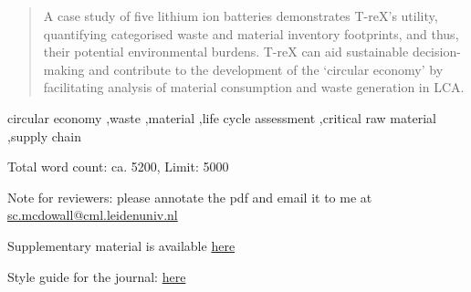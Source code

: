 \documentclass[review,3p,authoryear]{elsarticle}
\newcommand{\cbox}[1]{
    \begin{tcolorbox}[hbox, colback=red!5!white, colframe=red!65!black, boxrule=0.25pt, boxsep=2pt, left=2pt, right=2pt, top=1pt, bottom=1pt]
        \small\sffamily #1
    \end{tcolorbox}
}
\begin{document}
\begin{frontmatter}
\begin{abstract}
        A case study of five lithium ion batteries demonstrates T-reX's utility, quantifying categorised waste and material inventory footprints, and thus, their potential environmental burdens. T-reX can aid sustainable decision-making and contribute to the development of the `circular economy' by facilitating analysis of material consumption and waste generation in LCA.

    \end{abstract}


    \begin{keyword}
        circular economy \sep waste \sep material \sep life cycle assessment \sep critical raw material \sep supply chain
    \end{keyword}

\end{frontmatter}
\cbox{Total word count: ca. 5200, Limit: 5000}
\cbox{Note for reviewers: please annotate the pdf and email it to me at \href{mailto:sc.mcdowall@cml.leidenuniv.nl}{sc.mcdowall@cml.leidenuniv.nl}}
\cbox{Supplementary material is available \href{https://github.com/Stew-McD/T-reX_Publication/blob/main/reviews/T-reX_Manuscript_V3/T-reX_manuscript_V3_SupplementaryMaterial.pdf}{here}}
\cbox{Style guide for the journal: \href{https://www.sciencedirect.com/journal/resources-conservation-and-recycling/publish/guide-for-authors}{here}}
\end{document}
